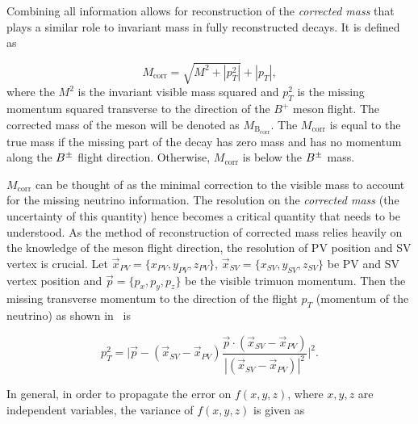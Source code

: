 Combining all information allows for reconstruction of the \emph{corrected mass} that plays a similar role to invariant mass in fully reconstructed decays. It is defined as

\begin{equation}
	M_{\mathrm{corr}} = \sqrt{{M}^{2} + |p^{2}_{T}|} + |p_{T}|,
\label{eq:corrm}        
\end{equation}	
where the $M^{2}$ is the invariant visible mass squared and $p^{2}_{T}$ is the missing momentum squared transverse to the direction of the $B^{+}$ meson flight. The corrected mass of the \Bpm meson will be denoted as $M_{\mathrm{B_{corr}}}$. The $M_{\mathrm{corr}}$ is equal to the true mass if the missing part of the decay has zero mass and has no momentum along the ${{B}^\pm}$ flight direction. Otherwise, $M_{\mathrm{corr}}$ is below the ${{B}^\pm}$ mass.

$M_{\mathrm{corr}}$ can be thought of as the minimal correction to the visible mass to account for the missing neutrino information. The resolution on the \textit{corrected mass} (the uncertainty of this quantity) hence becomes a critical quantity that needs to be understood. As the method of reconstruction of corrected mass relies heavily on the knowledge of the \Bpm meson flight direction, the resolution of \gls{PV} position and \gls{SV} vertex is crucial. Let $\vec{{x}}_{PV}=\{x_{PV},y_{PV},z_{PV}\}$, $\vec{{x}}_{SV}=\{x_{SV},y_{SV},z_{SV}\} $ be \gls{PV} and \gls{SV} vertex position and $\vec{p}=\{p_{x},p_{y},p_{z}\}$ be the visible trimuon momentum. Then the missing transverse momentum to the direction of the flight $p_{T}$ (momentum of the neutrino) as shown in~\cite{Egede:1694339} is


\begin{equation}
	p^{2}_{T} = \Big|\vec{p} - (\vec{{x}}_{SV}-\vec{{x}}_{PV})\frac{\vec{p} \cdot(\vec{{x}}_{SV}-\vec{{x}}_{PV})}{|(\vec{{x}}_{SV}-\vec{{x}}_{PV})|^{2}}\Big|^{2}. 
\label{eq:ptmis}
\end{equation}



In general, in order to propagate the error on $f(x,y,z)$, where $x,y,z$ are independent variables, the variance of $f(x,y,z)$ is given as

